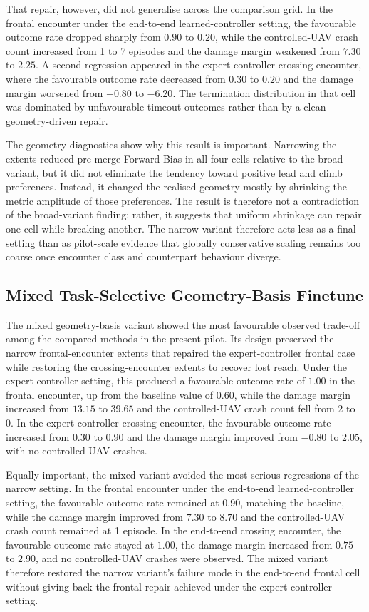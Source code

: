 \documentclass[drones,article,submit,pdftex,moreauthors]{Definitions/mdpi}
\begin{document}
That repair, however, did not generalise across the comparison grid. In the frontal encounter under the end-to-end learned-controller setting, the favourable outcome rate dropped sharply from $0.90$ to $0.20$, while the controlled-UAV crash count increased from 1 to 7 episodes and the damage margin weakened from $7.30$ to $2.25$. A second regression appeared in the expert-controller crossing encounter, where the favourable outcome rate decreased from $0.30$ to $0.20$ and the damage margin worsened from $-0.80$ to $-6.20$. The termination distribution in that cell was dominated by unfavourable timeout outcomes rather than by a clean geometry-driven repair.

The geometry diagnostics show why this result is important. Narrowing the extents reduced pre-merge Forward Bias in all four cells relative to the broad variant, but it did not eliminate the tendency toward positive lead and climb preferences. Instead, it changed the realised geometry mostly by shrinking the metric amplitude of those preferences. The result is therefore not a contradiction of the broad-variant finding; rather, it suggests that uniform shrinkage can repair one cell while breaking another. The narrow variant therefore acts less as a final setting than as pilot-scale evidence that globally conservative scaling remains too coarse once encounter class and counterpart behaviour diverge.

\subsection{Mixed Task-Selective Geometry-Basis Finetune}

The mixed geometry-basis variant showed the most favourable observed trade-off among the compared methods in the present pilot. Its design preserved the narrow frontal-encounter extents that repaired the expert-controller frontal case while restoring the crossing-encounter extents to recover lost reach. Under the expert-controller setting, this produced a favourable outcome rate of $1.00$ in the frontal encounter, up from the baseline value of $0.60$, while the damage margin increased from $13.15$ to $39.65$ and the controlled-UAV crash count fell from 2 to 0. In the expert-controller crossing encounter, the favourable outcome rate increased from $0.30$ to $0.90$ and the damage margin improved from $-0.80$ to $2.05$, with no controlled-UAV crashes.

Equally important, the mixed variant avoided the most serious regressions of the narrow setting. In the frontal encounter under the end-to-end learned-controller setting, the favourable outcome rate remained at $0.90$, matching the baseline, while the damage margin improved from $7.30$ to $8.70$ and the controlled-UAV crash count remained at 1 episode. In the end-to-end crossing encounter, the favourable outcome rate stayed at $1.00$, the damage margin increased from $0.75$ to $2.90$, and no controlled-UAV crashes were observed. The mixed variant therefore restored the narrow variant's failure mode in the end-to-end frontal cell without giving back the frontal repair achieved under the expert-controller setting.
\end{document}
